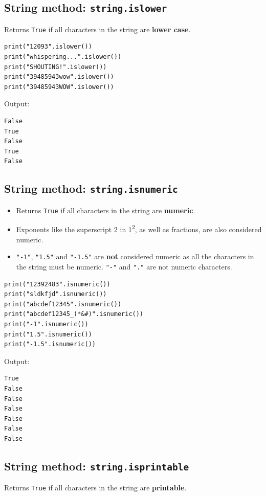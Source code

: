 \documentclass[11pt]{article}
\begin{document}
\subsection{String method: \texttt{string.islower}}
\label{sec:org68f0fe6}
Returns \texttt{True} if all characters in the string are \textbf{lower case}.

\begin{verbatim}
print("12093".islower())
print("whispering...".islower())
print("SHOUTING!".islower())
print("39485943wow".islower())
print("39485943WOW".islower())
\end{verbatim}

 \noindent Output:

\begin{verbatim}
False
True
False
True
False
\end{verbatim}


 \newpage

\subsection{String method: \texttt{string.isnumeric}}
\label{sec:orgbd24095}
\begin{itemize}
\item Returns \texttt{True} if all characters in the string are \textbf{numeric}.
\item Exponents like the superscript 2 in 1\textsuperscript{2}, as well as fractions, are also considered numeric.
\item \texttt{"-1"}, \texttt{"1.5"} and \texttt{"-1.5"} are \textbf{not} considered numeric as all the characters in the string must be numeric. \texttt{"-"} and \texttt{"."} are not numeric characters.
\end{itemize}

\begin{verbatim}
print("12392483".isnumeric())
print("sldkfjd".isnumeric())
print("abcdef12345".isnumeric())
print("abcdef12345_(*&#)".isnumeric())
print("-1".isnumeric())
print("1.5".isnumeric())
print("-1.5".isnumeric())
\end{verbatim}

 \noindent Output:

\begin{verbatim}
True
False
False
False
False
False
False
\end{verbatim}

\subsection{String method: \texttt{string.isprintable}}
\label{sec:orgd7cee4e}
Returns \texttt{True} if all characters in the string are \textbf{printable}.
\end{document}
